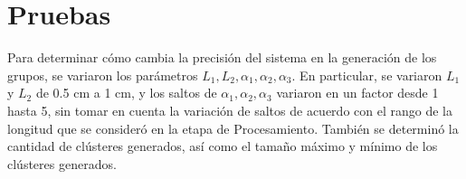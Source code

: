 \section{Pruebas}

Para determinar cómo cambia la precisión del sistema en la generación de los grupos, se variaron los parámetros $L_1, L_2, \alpha_1, \alpha_2, \alpha_3$. En particular, se variaron $L_1$ y $L_2$ de 0.5 cm a 1 cm, y los saltos de $\alpha_1, \alpha_2, \alpha_3$ variaron en un factor desde 1 hasta 5, sin tomar en cuenta la variación de saltos de acuerdo con el rango de la longitud que se consideró en la etapa de Procesamiento. También se determinó la cantidad de clústeres generados, así como el tamaño máximo y mínimo de los clústeres generados.